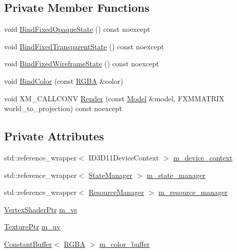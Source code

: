 \subsection*{Private Member Functions}
\begin{DoxyCompactItemize}
\item 
void \hyperlink{classmage_1_1rendering_1_1_forward_pass_af66584e7efc3565f23f7b5940d6f35eb}{Bind\+Fixed\+Opaque\+State} () const noexcept
\item 
void \hyperlink{classmage_1_1rendering_1_1_forward_pass_aefd3217115558f90b92a1521adfb8bb8}{Bind\+Fixed\+Transparent\+State} () const noexcept
\item 
void \hyperlink{classmage_1_1rendering_1_1_forward_pass_a1d5c1efa0b532674124a264f61f75a07}{Bind\+Fixed\+Wireframe\+State} () const noexcept
\item 
void \hyperlink{classmage_1_1rendering_1_1_forward_pass_a1431c5d2bd8cccc55427aa1cf9a64845}{Bind\+Color} (const \hyperlink{structmage_1_1_r_g_b_a}{R\+G\+BA} \&color)
\item 
void X\+M\+\_\+\+C\+A\+L\+L\+C\+O\+NV \hyperlink{classmage_1_1rendering_1_1_forward_pass_a44354b5b6ccfe27fdc436a37da34c47e}{Render} (const \hyperlink{classmage_1_1rendering_1_1_model}{Model} \&model, F\+X\+M\+M\+A\+T\+R\+IX world\+\_\+to\+\_\+projection) const noexcept
\end{DoxyCompactItemize}
\subsection*{Private Attributes}
\begin{DoxyCompactItemize}
\item 
std\+::reference\+\_\+wrapper$<$ I\+D3\+D11\+Device\+Context $>$ \hyperlink{classmage_1_1rendering_1_1_forward_pass_a4bc03d77fd5a385a9c5878db8028dcc4}{m\+\_\+device\+\_\+context}
\item 
std\+::reference\+\_\+wrapper$<$ \hyperlink{classmage_1_1rendering_1_1_state_manager}{State\+Manager} $>$ \hyperlink{classmage_1_1rendering_1_1_forward_pass_a01d72a7d6be3f98806df7780c94916ff}{m\+\_\+state\+\_\+manager}
\item 
std\+::reference\+\_\+wrapper$<$ \hyperlink{classmage_1_1rendering_1_1_resource_manager}{Resource\+Manager} $>$ \hyperlink{classmage_1_1rendering_1_1_forward_pass_a2b0fe58480704725219acff176695819}{m\+\_\+resource\+\_\+manager}
\item 
\hyperlink{namespacemage_1_1rendering_aaf704b9c54a4181f4950a1761de69dda}{Vertex\+Shader\+Ptr} \hyperlink{classmage_1_1rendering_1_1_forward_pass_ae1483b1f37cd65efdf6059bcc7d1dd09}{m\+\_\+vs}
\item 
\hyperlink{namespacemage_1_1rendering_a6f3ae54f825328465b0cdde0f0de4a36}{Texture\+Ptr} \hyperlink{classmage_1_1rendering_1_1_forward_pass_ab2fcc28c086c7ddb6e13bfd5f9d994b9}{m\+\_\+uv}
\item 
\hyperlink{classmage_1_1rendering_1_1_constant_buffer}{Constant\+Buffer}$<$ \hyperlink{structmage_1_1_r_g_b_a}{R\+G\+BA} $>$ \hyperlink{classmage_1_1rendering_1_1_forward_pass_ace4259d7a292982a3f3111b24fcf7c51}{m\+\_\+color\+\_\+buffer}
\end{DoxyCompactItemize}


